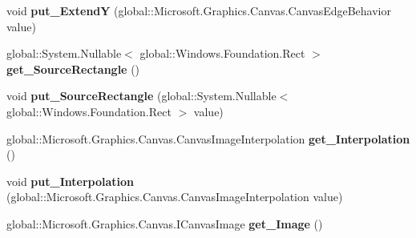 \begin{DoxyCompactItemize}
\mbox{\label{interface_microsoft_1_1_graphics_1_1_canvas_1_1_brushes_1_1_i_canvas_image_brush_a02ac0206445780a5997e968f76eeb0f0}} 
void {\bfseries put\+\_\+\+ExtendY} (global\+::\+Microsoft.\+Graphics.\+Canvas.\+Canvas\+Edge\+Behavior value)
\item 
\mbox{\label{interface_microsoft_1_1_graphics_1_1_canvas_1_1_brushes_1_1_i_canvas_image_brush_abd99fb761de06f6a5a4446147e3b0dee}} 
global\+::\+System.\+Nullable$<$ global\+::\+Windows.\+Foundation.\+Rect $>$ {\bfseries get\+\_\+\+Source\+Rectangle} ()
\item 
\mbox{\label{interface_microsoft_1_1_graphics_1_1_canvas_1_1_brushes_1_1_i_canvas_image_brush_a18db26edd67cb06b7b78f0e7709c8806}} 
void {\bfseries put\+\_\+\+Source\+Rectangle} (global\+::\+System.\+Nullable$<$ global\+::\+Windows.\+Foundation.\+Rect $>$ value)
\item 
\mbox{\label{interface_microsoft_1_1_graphics_1_1_canvas_1_1_brushes_1_1_i_canvas_image_brush_aebd2633bbc018c5fc49fd70e6a24fed8}} 
global\+::\+Microsoft.\+Graphics.\+Canvas.\+Canvas\+Image\+Interpolation {\bfseries get\+\_\+\+Interpolation} ()
\item 
\mbox{\label{interface_microsoft_1_1_graphics_1_1_canvas_1_1_brushes_1_1_i_canvas_image_brush_a149e4d24e65f75b3f58f3a71d893bcd4}} 
void {\bfseries put\+\_\+\+Interpolation} (global\+::\+Microsoft.\+Graphics.\+Canvas.\+Canvas\+Image\+Interpolation value)
\item 
\mbox{\label{interface_microsoft_1_1_graphics_1_1_canvas_1_1_brushes_1_1_i_canvas_image_brush_a0a2e397b21701c2009442817061aea19}} 
global\+::\+Microsoft.\+Graphics.\+Canvas.\+I\+Canvas\+Image {\bfseries get\+\_\+\+Image} ()
\item 
\mbox{\label{interface_microsoft_1_1_graphics_1_1_canvas_1_1_brushes_1_1_i_canvas_image_brush_adce6e5d6d2750a7392b5352faf3f5f4d}} 

\end{DoxyCompactItemize}
